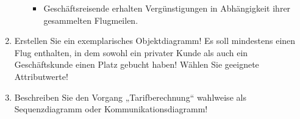\documentclass{lehramt-informatik-aufgabe}
\begin{document}
\begin{enumerate}
\begin{itemize}
\begin{itemize}
\item Geschäftsreisende erhalten Vergünstigungen in Abhängigkeit ihrer
gesammelten Flugmeilen.
\end{itemize}
\end{itemize}


\item Erstellen Sie ein exemplarisches Objektdiagramm! Es soll
mindestens einen Flug enthalten, in dem sowohl ein privater Kunde als
auch ein Geschäftskunde einen Platz gebucht haben! Wählen Sie geeignete
Attributwerte!


\item Beschreiben Sie den Vorgang „Tarifberechnung“ wahlweise als
Sequenzdiagramm oder Kommunikationsdiagramm!

\end{enumerate}
\end{document}
